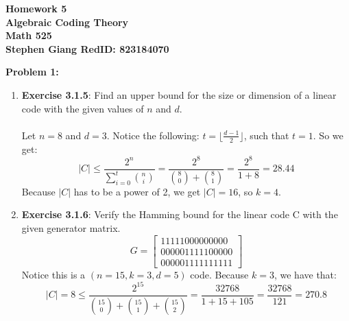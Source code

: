 \documentclass[11pt]{article}
\newcommand{\skipline}{\vspace{\baselineskip}}
\newenvironment{problem}[1]{\textbf{Problem #1: }}{\newpage}
\begin{document}
	
	\begin{center}
		\textbf{Homework 5} \\
		\textbf{Algebraic Coding Theory} \\
		\textbf{Math 525} \\
		\textbf{Stephen Giang RedID: 823184070} \\
		\skipline \skipline
	\end{center}

	\begin{problem}{1}
		\begin{enumerate}[label = (\alph*)]
			\item \textbf{Exercise 3.1.5}:  
			Find an upper bound for the size or dimension of a  linear code with the given values of $n$ and $d$. 
			\\ \\
			Let $n = 8$ and $d = 3$.  Notice the following: $t = \lfloor\frac{d-1}{2}\rfloor$, such that $t = 1$.  So we get:
			\[|C| \leq \frac{2^n}{\sum_{i = 0}^{t} \binom{n}{i}} = \frac{2^8}{\binom{8}{0} + \binom{8}{1}} = \frac{2^8}{1 + 8} = 28.44\]
			Because $|C|$ has to be a power of 2, we get $|C| = 16$, so $k = 4$.
			\item \textbf{Exercise 3.1.6}: 
			Verify the Hamming bound for the linear code C with the given generator matrix.
			\[G = \begin{bmatrix}
				11111000000000 \\ 000001111100000 \\ 000001111111111
			\end{bmatrix}\]
			Notice this is a $(n=15, k = 3, d = 5)$ code.  Because $k = 3$, we have that:
			\[|C| = 8 \leq \frac{2^{15}}{\binom{15}{0} + \binom{15}{1} + \binom{15}{2}} = \frac{32768}{1 + 15 + 105} = \frac{32768}{121} = 270.8\]
		\end{enumerate}
	\end{problem}
\end{document}
